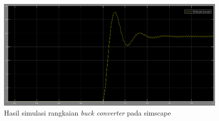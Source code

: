 \documentclass[../main.tex]{subfiles}
\begin{document}
            \begin{figure}[H]
                \centering
                \includegraphics[width = \textwidth]{assets/image/HASIL_SIMULASI_BUCK.png}
                \caption{Hasil simulasi rangkaian \textit{buck converter} pada simscape}
                \label{hasil_simulasi_buck_converter}
            \end{figure}
\end{document}
